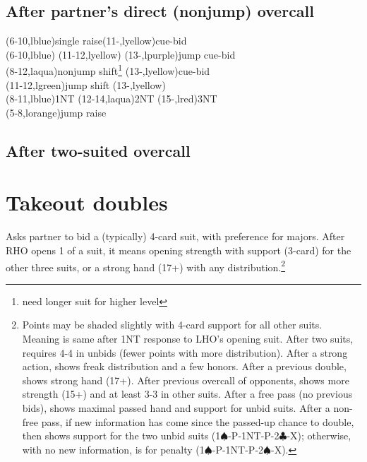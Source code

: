 \documentclass[oneside]{memoir}
\def\C{$\clubsuit$}
\def\S{$\spadesuit$}
\begin{document}
\subsection{After partner's direct (nonjump) overcall}
\begin{ptable}
  \bid*(6-10,lblue){single raise}\bid*(11-,lyellow){cue-bid}\\
  \bid(6-10,lblue){}
  \bid(11-12,lyellow){}
  \bid(13-,lpurple){jump cue-bid}\\
  \bid(8-12,laqua){nonjump shift\footnote{need longer suit for higher level}}
  \bid*(13-,lyellow){cue-bid}\\
  \bid(11-12,lgreen){jump shift}
  \bid(13-,lyellow){}\\
  \bid(8-11,lblue){1NT}
  \bid(12-14,laqua){2NT}
  \bid(15-,lred){3NT}\\
\bid(5-8,lorange){jump raise}\\
\end{ptable}

\subsection{After two-suited overcall}

\section{Takeout doubles}
Asks partner to bid a (typically) 4-card suit, with preference for
majors.  After RHO opens 1 of a suit, it means opening strength with
support (3-card) for the other three suits, or a strong hand (17+) with any
distribution.\footnote{Points may be shaded slightly with 4-card support
for all other suits.  Meaning is same after 1NT response to LHO's opening
suit.  After two suits, requires 4-4 in unbids (fewer points with more
distribution).  After a strong action, shows freak distribution and a
few honors.  After a previous double, shows strong hand (17+).  After
previous overcall of opponents, shows more strength (15+) and at least
3-3 in other suits.  After a free pass (no previous bids), shows
maximal passed hand and support for unbid suits.  After a non-free
pass, if new information has come since the passed-up chance to
double, then shows support for the two unbid suits
(1\S-P-1NT-P-2\C-X); otherwise, with no new information, is for
penalty (1\S-P-1NT-P-2\S-X).}
\end{document}
